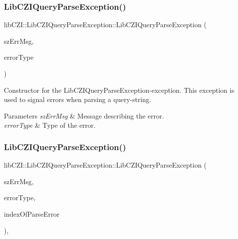 \subsubsection{\texorpdfstring{Lib\+C\+Z\+I\+Query\+Parse\+Exception()}{LibCZIQueryParseException()}\hspace{0.1cm}{\footnotesize\ttfamily [1/2]}}
{\footnotesize\ttfamily lib\+C\+Z\+I\+::\+Lib\+C\+Z\+I\+Query\+Parse\+Exception\+::\+Lib\+C\+Z\+I\+Query\+Parse\+Exception (\begin{DoxyParamCaption}\item[{const char $\ast$}]{sz\+Err\+Msg,  }\item[{\hyperlink{classlib_c_z_i_1_1_lib_c_z_i_query_parse_exception_adf5a11c2415ec7c92d95365fa5af2fde}{Error\+Type}}]{error\+Type }\end{DoxyParamCaption})\hspace{0.3cm}{\ttfamily [inline]}}

Constructor for the Lib\+C\+Z\+I\+Query\+Parse\+Exception-\/exception. This exception is used to signal errors when parsing a query-\/string. 
\begin{DoxyParams}{Parameters}
{\em sz\+Err\+Msg} & Message describing the error. \\
\hline
{\em error\+Type} & Type of the error. \\
\hline
\end{DoxyParams}
\mbox{\label{classlib_c_z_i_1_1_lib_c_z_i_query_parse_exception_a93adeb0fad20a3c8c4ea7ba68e49d127}} 
\subsubsection{\texorpdfstring{Lib\+C\+Z\+I\+Query\+Parse\+Exception()}{LibCZIQueryParseException()}\hspace{0.1cm}{\footnotesize\ttfamily [2/2]}}
{\footnotesize\ttfamily lib\+C\+Z\+I\+::\+Lib\+C\+Z\+I\+Query\+Parse\+Exception\+::\+Lib\+C\+Z\+I\+Query\+Parse\+Exception (\begin{DoxyParamCaption}\item[{const char $\ast$}]{sz\+Err\+Msg,  }\item[{\hyperlink{classlib_c_z_i_1_1_lib_c_z_i_query_parse_exception_adf5a11c2415ec7c92d95365fa5af2fde}{Error\+Type}}]{error\+Type,  }\item[{int}]{index\+Of\+Parse\+Error }\end{DoxyParamCaption})\hspace{0.3cm}{\ttfamily [inline]}, {\ttfamily [explicit]}}

